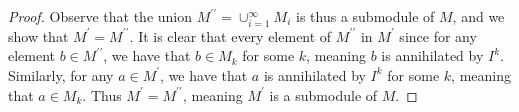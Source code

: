 \documentclass[11pt]{article}
\newcommand{\dprime}{\prime\prime}
\begin{document}
\begin{enumerate}
\begin{proof}
      Observe that the union $M^{\dprime} = \cup_{i=1}^\infty M_i$ is thus a submodule of $M$, and we show that $M^\prime = M^{\dprime}$. It is clear that every element of $M^{\dprime}$ in $M^\prime$ since for any element $b\in M^{\dprime}$, we have that $b\in M_k$ for some $k$, meaning $b$ is annihilated by $I^k$. Similarly, for any $a\in M^\prime$, we have that $a$ is annihilated by $I^k$ for some $k$, meaning that $a\in M_k$. Thus $M^\prime = M^{\dprime}$, meaning $M^\prime$ is a submodule of $M$.
    \end{proof}
\end{enumerate}
\end{document}
